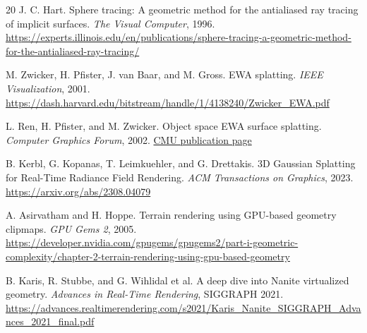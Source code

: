 \documentclass[11pt]{article}
\begin{document}
\begin{thebibliography}{20}
J. C. Hart.
\newblock Sphere tracing: A geometric method for the antialiased ray tracing of implicit surfaces.
\newblock \emph{The Visual Computer}, 1996.
\newblock \url{https://experts.illinois.edu/en/publications/sphere-tracing-a-geometric-method-for-the-antialiased-ray-tracing/}

M. Zwicker, H. Pfister, J. van Baar, and M. Gross.
\newblock EWA splatting.
\newblock \emph{IEEE Visualization}, 2001.
\newblock \url{https://dash.harvard.edu/bitstream/handle/1/4138240/Zwicker_EWA.pdf}

L. Ren, H. Pfister, and M. Zwicker.
\newblock Object space EWA surface splatting.
\newblock \emph{Computer Graphics Forum}, 2002.
\newblock \href{https://publications.ri.cmu.edu/object-space-ewa-surface-splatting-a-hardware-accelerated-approach-to-high-quality-point-rendering/}{CMU publication page}

B. Kerbl, G. Kopanas, T. Leimkuehler, and G. Drettakis.
\newblock 3D Gaussian Splatting for Real-Time Radiance Field Rendering.
\newblock \emph{ACM Transactions on Graphics}, 2023.
\newblock \url{https://arxiv.org/abs/2308.04079}

A. Asirvatham and H. Hoppe.
\newblock Terrain rendering using GPU-based geometry clipmaps.
\newblock \emph{GPU Gems 2}, 2005.
\newblock \url{https://developer.nvidia.com/gpugems/gpugems2/part-i-geometric-complexity/chapter-2-terrain-rendering-using-gpu-based-geometry}

B. Karis, R. Stubbe, and G. Wihlidal et al.
\newblock A deep dive into Nanite virtualized geometry.
\newblock \emph{Advances in Real-Time Rendering}, SIGGRAPH 2021.
\newblock \url{https://advances.realtimerendering.com/s2021/Karis_Nanite_SIGGRAPH_Advances_2021_final.pdf}

\end{thebibliography}
\end{document}
